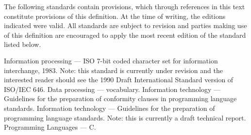 %
\begin{optDefinition}
The following standards contain provisions, which through references
in this text constitute provisions of this definition.  At the
time of writing, the editions indicated were valid.  All standards are
subject to revision and parties making use of this definition are
encouraged to apply the most recent edition of the standard listed
below.
\begin{references}
     Information processing --- ISO 7-bit coded
    character set for information interchange, 1983.  Note: this standard is
    currently under revision and the interested reader should see the 1990 Draft
    International Standard version of ISO/IEC 646.
     Data processing --- vocabulary.
     Information technology ---
    Guidelines for the preparation of conformity clauses in programming language
    standards.
     Information technology ---
    Guidelines for the preparation of programming language standards. Note: this
    is currently a draft technical report.
     Programming Languages --- C.
\end{references}
\end{optDefinition}
%
\label{subsubsec:cse}
